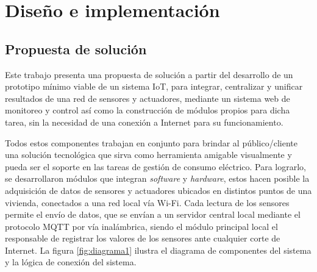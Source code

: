 \chapter{Diseño e implementación} %

\label{Chapter3} %






\section{Propuesta de solución}

Este trabajo presenta una propuesta de solución a partir del desarrollo de un prototipo mínimo viable de un sistema IoT, para integrar, centralizar y unificar resultados de una red de sensores y actuadores, mediante un sistema web de monitoreo y control así como la construcción de módulos propios para dicha tarea, sin la necesidad de una conexión a Internet para su funcionamiento. 

Todos estos componentes trabajan en conjunto para brindar al público/cliente una solución tecnológica que sirva como herramienta amigable visualmente y pueda ser el soporte en las tareas de gestión de consumo eléctrico. Para lograrlo, se desarrollaron módulos que integran \emph{software} y \emph{hardware}, estos hacen posible la adquisición de datos de sensores y actuadores ubicados en distintos puntos de una vivienda, conectados a una red local vía Wi-Fi. Cada lectura de los sensores permite el envío de datos, que se envían a un servidor central local mediante el protocolo MQTT por vía inalámbrica, siendo el módulo principal local el responsable de registrar los valores de los sensores ante cualquier corte de Internet. La figura \ref{fig:diagrama1} ilustra el diagrama de componentes del sistema y la lógica de conexión del sistema.

